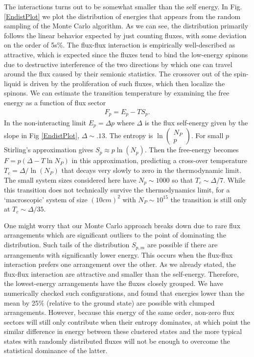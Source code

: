 \documentclass[reprint,amsmath,amssymb,aps,prl,groupedaddress,nofootinbib,superscriptaddress]{revtex4-1}
\newcommand{\1}{\mathds{1}}
\begin{document}
The interactions turns out to be somewhat smaller than the self energy. In Fig. \ref{EndistPlot} we plot the distribution of energies that appears from the random sampling of the Monte Carlo algorithm. As we can see, the distribution primarily follows the linear behavior expected by just counting fluxes, with some deviation on the order of 5s\%. The flux-flux interaction is empirically well-described as attractive, which is expected since the fluxes tend to bind the low-energy spinons due to destructive interference of the two directions by which one can travel around the flux caused by their semionic statistics. The crossover out of the spin-liquid is driven by the proliferation of such fluxes, which then localize the spinons. We can estimate the transition temperature by examining the free energy as a function of flux sector
\begin{align}
F_p = E_p - T S_p.
\end{align}
In the non-interacting limit $E_p = \Delta p$ where $\Delta$ is the flux self-energy given by the slope in Fig \ref{EndistPlot}, $\Delta \sim .13$. The entropy is $\ln\left(\begin{array}{c}
N_P \\ p
\end{array}\right)$. For small $p$ Stirling's approximation gives $S_p \approx p \ln(N_p)$. Then the free-energy becomes $F = p (\Delta - T\ln N_P)$ in this approximation, predicting a cross-over temperature $T_c = \Delta / \ln(N_P)$ that decays very slowly to zero in the thermodynamic limit. The small system sizes considered here have $N_p \sim 1000$ so that $T_c \sim \Delta / 7$. While this transition does not technically survive the thermodynamics limit, for a `macroscopic' system of size $(10cm)^2$ with $N_P \sim 10^15$ the transition is still only at $T_c \sim \Delta / 35$.

One might worry that our Monte Carlo approach breaks down due to rare flux arrangements which are significant outliers to the point of dominating the distribution. Such tails of the distribution $S_{p,m}$ are possible if there are arrangements with significantly lower energy. This occurs when the flux-flux interaction prefers one arrangement over the other. As we already stated, the flux-flux interaction are attractive and smaller than the self-energy. Therefore, the lowest-energy arrangements have the fluxes closely grouped. We have numerically checked such configurations, and found that energies lower than the mean by 25\% (relative to the ground state) are possible with clumped arrangements. However, because this energy of the same order, non-zero flux sectors will still only contribute when their entropy dominates, at which point the similar difference in energy between these clustered states and the more typical states with randomly distributed fluxes will not be enough to overcome the statistical dominance of the latter.%
\end{document}
